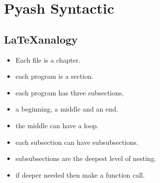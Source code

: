 \documentclass[12pt]{report}
\begin{document}
\chapter{Pyash Syntactic}
\section{\LaTeX analogy} 
\begin{itemize}
  \item Each file is a chapter.
  \item each program is a section.
  \item each program has three subsections,
  \item a beginning, a middle and an end. 
  \item the middle can have a loop.
  \item each subsection can have subsubsections.
  \item subsubsections are the deepest level of nesting.
  \item if deeper needed then make a function call.
\end{itemize}
\end{document}
